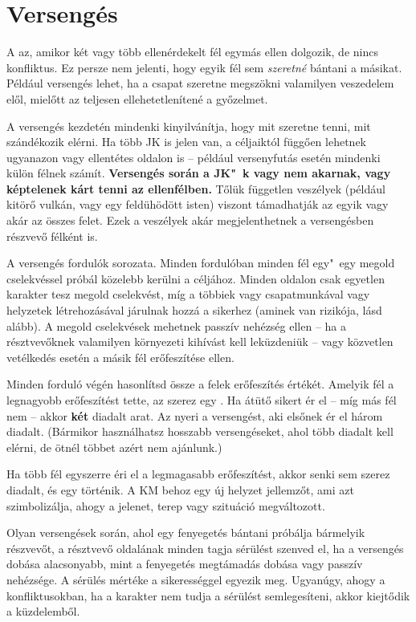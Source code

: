 \section{Versengés}

A  az, amikor két vagy több ellenérdekelt fél egymás ellen dolgozik, de nincs konfliktus. Ez persze nem jelenti, hogy egyik fél sem \emph{szeretné} bántani a másikat. Például versengés lehet, ha a csapat szeretne megszökni valamilyen veszedelem elől, mielőtt az teljesen ellehetetlenítené a győzelmet.

A versengés kezdetén mindenki kinyilvánítja, hogy mit szeretne tenni, mit szándékozik elérni. Ha több JK is jelen van, a céljaiktól függően lehetnek ugyanazon vagy ellentétes oldalon is – például versenyfutás esetén mindenki külön félnek számít. \textbf{Versengés során a JK"~k vagy nem akarnak, vagy képtelenek kárt tenni az ellenfélben.} Tőlük független veszélyek (például kitörő vulkán, vagy egy feldühödött isten) viszont támadhatják az egyik vagy akár az összes felet. Ezek a veszélyek akár megjelenthetnek a versengésben részvevő félként is.

A versengés fordulók sorozata. Minden fordulóban minden fél egy"~egy megold cselekvéssel próbál közelebb kerülni a céljához. Minden oldalon csak egyetlen karakter tesz megold cselekvést, míg a többiek vagy csapatmunkával vagy helyzetek létrehozásával járulnak hozzá a sikerhez (aminek van rizikója, lásd alább). A megold cselekvések mehetnek passzív nehézség ellen – ha a résztvevőknek valamilyen környezeti kihívást kell leküzdeniük – vagy közvetlen vetélkedés esetén a másik fél erőfeszítése ellen.

Minden forduló végén hasonlítsd össze a felek erőfeszítés értékét. Amelyik fél a legnagyobb erőfeszítést tette, az szerez egy . Ha átütő sikert ér el – míg más fél nem – akkor \textbf{két} diadalt arat. Az nyeri a versengést, aki elsőnek ér el három diadalt. (Bármikor használhatsz hosszabb versengéseket, ahol több diadalt kell elérni, de ötnél többet azért nem ajánlunk.)

Ha több fél egyszerre éri el a legmagasabb erőfeszítést, akkor senki sem szerez diadalt, és egy  történik. A KM behoz egy új helyzet jellemzőt, ami azt szimbolizálja, ahogy a jelenet, terep vagy szituáció megváltozott.

Olyan versengések során, ahol egy fenyegetés bántani próbálja bármelyik részvevőt, a résztvevő oldalának minden tagja sérülést szenved el, ha a versengés dobása alacsonyabb, mint a fenyegetés megtámadás dobása vagy passzív nehézsége. A sérülés mértéke a sikerességgel egyezik meg. Ugyanúgy, ahogy a konfliktusokban, ha a karakter nem tudja a sérülést semlegesíteni, akkor kiejtődik a küzdelemből.

